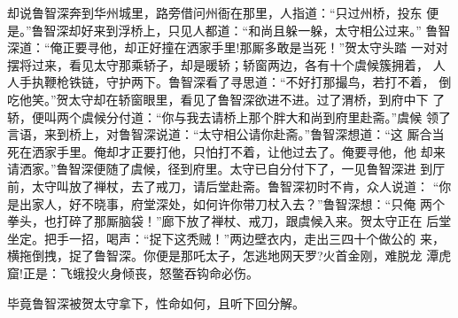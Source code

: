 却说鲁智深奔到华州城里，路旁借问州衙在那里，人指道：“只过州桥，投东
便是。”鲁智深却好来到浮桥上，只见人都道：“和尚且躲一躲，太守相公过来。”
鲁智深道：“俺正要寻他，却正好撞在洒家手里!那厮多敢是当死！”贺太守头踏
一对对摆将过来，看见太守那乘轿子，却是暖轿；轿窗两边，各有十个虞候簇拥着，
人人手执鞭枪铁链，守护两下。鲁智深看了寻思道：“不好打那撮鸟，若打不着，
倒吃他笑。”贺太守却在轿窗眼里，看见了鲁智深欲进不进。过了渭桥，到府中下
了轿，便叫两个虞候分付道：“你与我去请桥上那个胖大和尚到府里赴斋。”虞候
领了言语，来到桥上，对鲁智深说道：“太守相公请你赴斋。”鲁智深想道：“这
厮合当死在洒家手里。俺却才正要打他，只怕打不着，让他过去了。俺要寻他，他
却来请洒家。”鲁智深便随了虞候，径到府里。太守已自分付下了，一见鲁智深进
到厅前，太守叫放了禅杖，去了戒刀，请后堂赴斋。鲁智深初时不肯，众人说道：
“你是出家人，好不晓事，府堂深处，如何许你带刀杖入去？”鲁智深想：“只俺
两个拳头，也打碎了那厮脑袋！”廊下放了禅杖、戒刀，跟虞候入来。贺太守正在
后堂坐定。把手一招，喝声：“捉下这秃贼！”两边壁衣内，走出三四十个做公的
来，横拖倒拽，捉了鲁智深。你便是那吒太子，怎逃地网天罗?火首金刚，难脱龙
潭虎窟!正是：飞蛾投火身倾丧，怒鳖吞钩命必伤。

毕竟鲁智深被贺太守拿下，性命如何，且听下回分解。